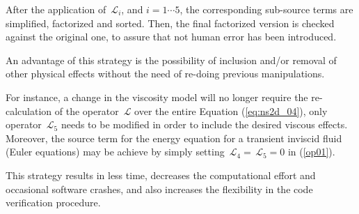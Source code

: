 \documentclass[10pt]{article}
\newcommand{\Lo}{\,\mathcal{L}}
\begin{document}
After the application of $\Lo_i$,  and $i=1\cdots5$, the corresponding sub-source terms are simplified, factorized and sorted. Then, the final factorized version is checked against the original one, to assure that not human error has been introduced.

An advantage of this strategy is the possibility of inclusion and/or removal of other physical effects without the need of re-doing previous manipulations.

For instance, a change in the viscosity model will no longer require the re-calculation of the operator $\Lo$ over the entire
Equation (\ref{eq:ns2d_04}), only operator $\Lo_5$ needs to be modified in order to include the desired viscous effects.
Moreover, the source term for the energy  equation for a transient inviscid fluid (Euler equations) may be achieve by simply setting $\Lo_4=\Lo_5=0$ in (\ref{op01}).

This strategy results in less time, decreases the computational effort and occasional software crashes, and also increases the flexibility in the code verification procedure.
\end{document}
